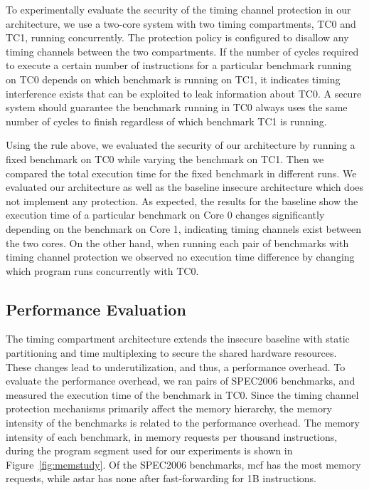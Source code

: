 To experimentally evaluate the security of the timing channel protection in our 
architecture, we use a two-core system with two timing compartments, TC0 and
TC1, running concurrently. The protection policy is configured to disallow any 
timing channels between the two compartments. If the number of cycles required 
to execute a certain number of instructions for a particular benchmark running on 
TC0 depends on which benchmark is running on TC1, it indicates timing 
interference exists that can be exploited to leak information about TC0. A 
secure system should guarantee the benchmark running in TC0 always uses the 
same number of cycles to finish regardless of which benchmark TC1 is running. 

Using the rule above, we evaluated the security of our architecture by running 
a fixed benchmark on TC0 while varying the benchmark on TC1. Then we compared 
the total execution time for the fixed benchmark in different runs. We 
evaluated our architecture as well as the baseline insecure architecture which 
does not implement any protection. As expected, the results for the baseline 
show the execution time of a particular benchmark on Core 0 changes significantly 
depending on the benchmark on Core 1, indicating timing channels exist between
the two cores. On the other hand, when running each pair of benchmarks with 
timing channel protection we observed no execution time difference by changing 
which program runs concurrently with TC0.

\subsection{Performance Evaluation}

The timing compartment architecture extends the insecure baseline with
static partitioning and time multiplexing to secure the shared hardware 
resources. These changes lead to underutilization, and thus, a performance
overhead. To evaluate the performance overhead, we ran pairs of
SPEC2006 benchmarks, and measured the execution time of the benchmark
in TC0. Since the timing channel protection mechanisms primarily affect the memory 
hierarchy, the memory intensity of the benchmarks is related to the performance 
overhead.
The memory intensity of each benchmark, in memory requests per thousand 
instructions, during the program segment used for our experiments is shown in
Figure~\ref{fig:memstudy}. Of the SPEC2006 benchmarks, mcf has the most memory 
requests, while astar has none after fast-forwarding for 1B instructions.

